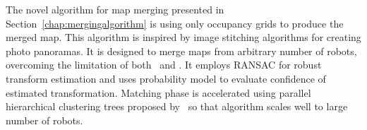 The novel algorithm for map merging presented in Section~\ref{chap:mergingalgorithm} is using only occupancy grids to produce the merged map. This algorithm is inspired by image stitching algorithms for creating photo panoramas. It is designed to merge maps from arbitrary number of robots, overcoming the limitation of both~\cite{MapstitchROS} and \cite{Carpin2008}. It employs \gls{RANSAC} for robust transform estimation and uses probability model to evaluate confidence of estimated transformation. Matching phase is accelerated using parallel hierarchical clustering trees proposed by~\cite{Muja2012} so that algorithm scales well to large number of robots.

